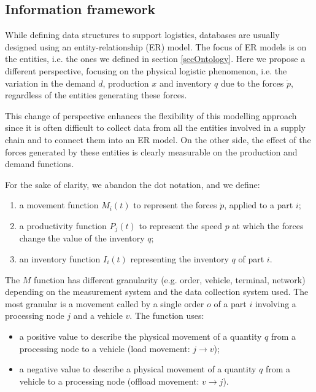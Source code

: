 \subsection{Information framework} \label{secInfoFramework}
While defining data structures to support logistics, databases are usually designed using an entity-relationship (ER) model. The focus of ER models is on the entities, i.e. the ones we defined in section \ref{secOntology}. Here we propose a different perspective, focusing on the physical logistic phenomenon, i.e. the variation in the demand $d$, production $x$ and inventory $q$ due to the forces $\dot{p}$, regardless of the entities generating these forces.\par

This change of perspective enhances the flexibility of this modelling approach since it is often difficult to collect data from all the entities involved in a supply chain and to connect them into an ER model. On the other side, the effect of the forces generated by these entities is clearly measurable on the production and demand functions.

For the sake of clarity, we abandon the dot notation, and we define:
\begin{enumerate}
    \item a movement function $M_i(t)$ to represent the forces $\dot{p}$, applied to a part $i$;
    \item a productivity function  $P_j(t)$ to represent the speed $p$ at which the forces change the value of the inventory $q$;
    \item an inventory function $I_i\left(t\right)$ representing the inventory $q$ of part $i$.
\end{enumerate}

The $M$ function has different granularity (e.g. order, vehicle, terminal, network) depending on the measurement system and the data collection system used. The most granular is a movement called by a single order $o$ of a part $i$ involving a processing node $j$ and a vehicle $v$. The function uses:

\begin{itemize}
    \item a positive value to describe the physical movement of a quantity $q$ from a processing node to a vehicle (load movement: $j\rightarrow v$);
    \item a negative value to describe a physical movement of a quantity $q$ from a vehicle to a processing node (offload movement: $v\rightarrow j$).
\end{itemize}


